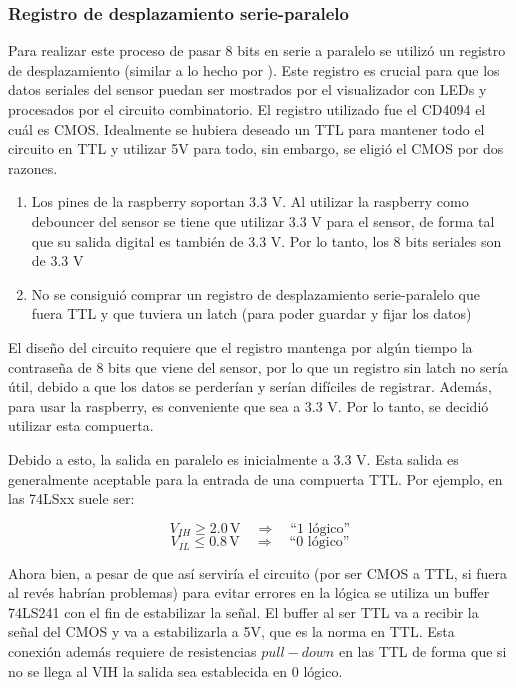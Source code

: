\documentclass[conference]{IEEEtran}  %
\begin{document}
\subsubsection{Registro de desplazamiento serie-paralelo}

Para realizar este proceso de pasar 8 bits en serie a paralelo se utilizó un registro de desplazamiento (similar a lo hecho por \cite{micropython2025registro}). Este registro es crucial para que los datos seriales del sensor puedan ser mostrados por el visualizador con LEDs y procesados por el circuito combinatorio. El registro utilizado fue el CD4094 el cuál es CMOS. Idealmente se hubiera deseado un TTL para mantener todo el circuito en TTL y utilizar 5V para todo, sin embargo, se eligió el CMOS por dos razones. 

\begin{enumerate}
    \item Los pines de la raspberry soportan 3.3 V. Al utilizar la raspberry como debouncer del sensor se tiene que utilizar 3.3 V para el sensor, de forma tal que su salida digital es también de 3.3 V. Por lo tanto, los 8 bits seriales son de 3.3 V
    \item No se consiguió comprar un registro de desplazamiento serie-paralelo que fuera TTL y que tuviera un latch (para poder guardar y fijar los datos)
\end{enumerate}

El diseño del circuito requiere que el registro mantenga por algún tiempo la contraseña de 8 bits que viene del sensor, por lo que un registro sin latch no sería útil, debido a que los datos se perderían y serían difíciles de registrar. Además, para usar la raspberry, es conveniente que sea a 3.3 V. Por lo tanto, se decidió utilizar esta compuerta.

Debido a esto, la salida en paralelo es inicialmente a 3.3 V. Esta salida es generalmente aceptable para la entrada de una compuerta TTL. Por ejemplo, en las 74LSxx suele ser:

\[
V_{IH} \geq 2.0 \,\text{V} \quad \Rightarrow \quad \text{``1 lógico''}
\]
\[
V_{IL} \leq 0.8 \,\text{V} \quad \Rightarrow \quad \text{``0 lógico''}
\]

Ahora bien, a pesar de que así serviría el circuito (por ser CMOS a TTL, si fuera al revés habrían problemas) para evitar errores en la lógica se utiliza un buffer 74LS241 con el fin de estabilizar la señal. El buffer al ser TTL va a recibir la señal del CMOS y va a estabilizarla a 5V, que es la norma en TTL. Esta conexión además requiere de resistencias $pull-down$ en las TTL de forma que si no se llega al VIH la salida sea establecida en 0 lógico. 
\end{document}
